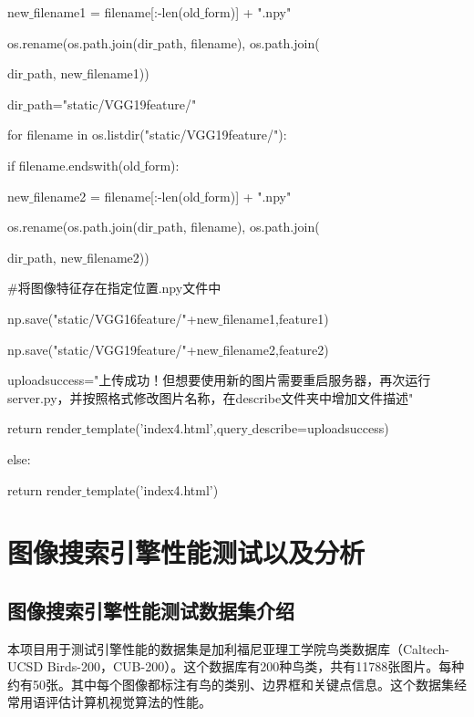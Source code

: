 \documentclass[bachelor_p]{hdu-thesis}
\begin{document}
\qquad \qquad \qquad \qquad new$\_$filename1 = filename[:-len(old$\_$form)] + ".npy"

\qquad \qquad \qquad \qquad os.rename(os.path.join(dir$\_$path, filename), os.path.join(
  
\qquad \qquad \qquad \qquad dir$\_$path, new$\_$filename1))   
        
\qquad \qquad dir$\_$path="static/VGG19feature/"
        
\qquad \qquad for filename in os.listdir("static/VGG19feature/"):

\qquad \qquad \qquad if filename.endswith(old$\_$form):

\qquad \qquad \qquad \qquad new$\_$filename2 = filename[:-len(old$\_$form)] + ".npy"

\qquad \qquad \qquad \qquad os.rename(os.path.join(dir$\_$path, filename), os.path.join(
  
\qquad \qquad \qquad \qquad dir$\_$path, new$\_$filename2))   
        
$\#$将图像特征存在指定位置.npy文件中

\qquad \qquad np.save("static/VGG16feature/"+new$\_$filename1,feature1)

\qquad \qquad np.save("static/VGG19feature/"+new$\_$filename2,feature2)
        
\qquad \qquad uploadsuccess="上传成功！但想要使用新的图片需要重启服务器，再次运行server.py，并按照格式修改图片名称，在describe文件夹中增加文件描述"
        
\qquad \qquad return render$\_$template('index4.html',query$\_$describe=uploadsuccess)

\qquad else:

\qquad \qquad return render$\_$template('index4.html')



\chapter{图像搜索引擎性能测试以及分析}

\section{图像搜索引擎性能测试数据集介绍}

本项目用于测试引擎性能的数据集是加利福尼亚理工学院鸟类数据库（Caltech-UCSD Birds-200，CUB-200）。这个数据库有200种鸟类，共有11788张图片。每种约有50张。其中每个图像都标注有鸟的类别、边界框和关键点信息。这个数据集经常用语评估计算机视觉算法的性能。
\end{document}

